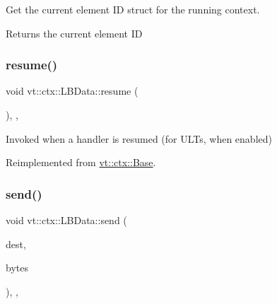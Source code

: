 Get the current element ID struct for the running context. 

\begin{DoxyReturn}{Returns}
the current element ID 
\end{DoxyReturn}
\mbox{\label{structvt_1_1ctx_1_1_l_b_data_a6910cc378cef1690e61fbbb97dc1524c}} 
\subsubsection{\texorpdfstring{resume()}{resume()}}
{\footnotesize\ttfamily void vt\+::ctx\+::\+L\+B\+Data\+::resume (\begin{DoxyParamCaption}{ }\end{DoxyParamCaption})\hspace{0.3cm}{\ttfamily [final]}, {\ttfamily [override]}, {\ttfamily [virtual]}}



Invoked when a handler is resumed (for U\+L\+Ts, when enabled) 



Reimplemented from \hyperlink{structvt_1_1ctx_1_1_base_a303afabb40ed83057fbe30c744db95da}{vt\+::ctx\+::\+Base}.

\mbox{\label{structvt_1_1ctx_1_1_l_b_data_ad99695a670b4e486603ff852785f611a}} 
\subsubsection{\texorpdfstring{send()}{send()}}
{\footnotesize\ttfamily void vt\+::ctx\+::\+L\+B\+Data\+::send (\begin{DoxyParamCaption}\item[{\hyperlink{structvt_1_1elm_1_1_element_i_d_struct}{elm\+::\+Element\+I\+D\+Struct}}]{dest,  }\item[{\hyperlink{namespacevt_a408e86a8c7c89309b52907dc5a513924}{Msg\+Size\+Type}}]{bytes }\end{DoxyParamCaption})\hspace{0.3cm}{\ttfamily [final]}, {\ttfamily [override]}, {\ttfamily [virtual]}}



